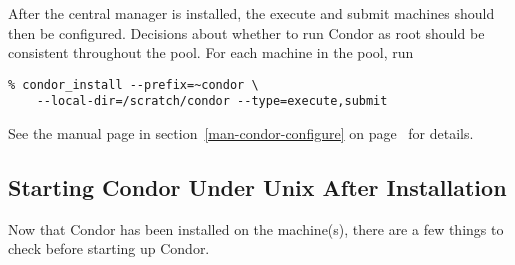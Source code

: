 After the central manager is installed, the execute and submit machines
should then be configured.  Decisions about whether to run Condor as root
should be consistent throughout the pool. For each machine in the pool,
run

\begin{verbatim}
% condor_install --prefix=~condor \
	--local-dir=/scratch/condor --type=execute,submit
\end{verbatim}

See the  manual page in
section~\ref{man-condor-configure} on
page~\pageref{man-condor-configure} for details.


\subsection{\label{installed-now-what}
Starting Condor Under Unix After Installation}

Now that Condor has been installed on the machine(s), there are a few
things to check before starting up Condor.


